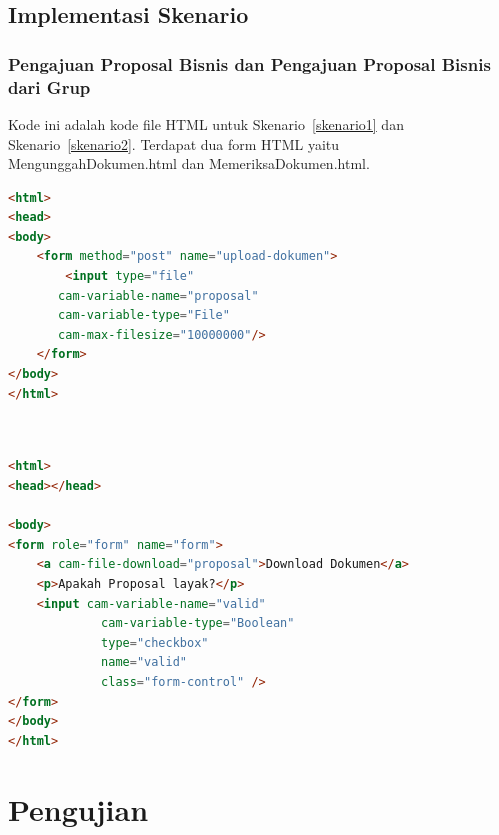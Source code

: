 \subsection{Implementasi Skenario}
\label{implementasiskenario}

\subsubsection{Pengajuan Proposal Bisnis dan Pengajuan Proposal Bisnis dari Grup}
Kode ini adalah kode file HTML untuk Skenario~\ref{skenario1} dan Skenario~\ref{skenario2}. Terdapat dua form HTML yaitu MengunggahDokumen.html dan MemeriksaDokumen.html. 
\begin{lstlisting}[language=html,basicstyle=\tiny,caption=MengunggahDokumen.html]
<html>
<head>
<body>
	<form method="post" name="upload-dokumen">
		<input type="file"
       cam-variable-name="proposal"
       cam-variable-type="File"
       cam-max-filesize="10000000"/>
	</form>
</body>
</html>

\end{lstlisting}

\begin{lstlisting}[language=html,basicstyle=\tiny,caption=MemeriksaDokumen.html]


<html>
<head></head>

<body>
<form role="form" name="form">
  	<a cam-file-download="proposal">Download Dokumen</a>
    <p>Apakah Proposal layak?</p>
    <input cam-variable-name="valid"
             cam-variable-type="Boolean"
             type="checkbox"
             name="valid"
             class="form-control" />  
</form> 
</body>
</html>

\end{lstlisting}

\section{Pengujian}
\label{sec:pengujian}

